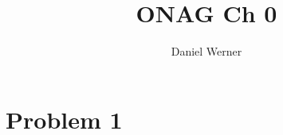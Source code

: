 \documentclass{article}
\title{ONAG Ch 0}
\author{Daniel Werner}
\begin{document}
\maketitle

\section*{Problem 1}


\end{document}
